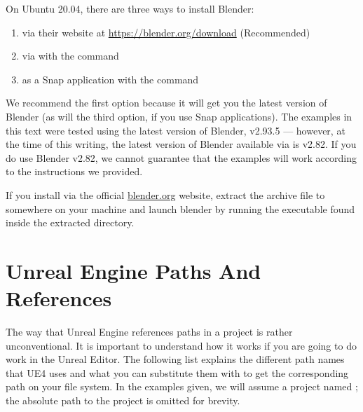 On Ubuntu 20.04, there are three ways to install Blender:

\begin{enumerate}
    \item via their website at \url{https://blender.org/download} (Recommended)
    \item via  with the command 
    \item as a Snap application with the command 
\end{enumerate}

We recommend the first option because it will get you the latest version of Blender (as will the third option, if you use Snap applications). The examples in this text were tested using the latest version of Blender, v2.93.5 --- however, at the time of this writing, the latest version of Blender available via  is v2.82. If you do use Blender v2.82, we cannot guarantee that the examples will work according to the instructions we provided.

If you install via the official \url{blender.org} website, extract the archive file to somewhere on your machine and launch blender by running the  executable found inside the extracted directory.

\section{Unreal Engine Paths And References}\label{apdx:unreal_paths}
The way that Unreal Engine references paths in a project is rather unconventional. It is important to understand how it works if you are going to do work in the Unreal Editor. The following list explains the different path names that UE4 uses and what you can substitute them with to get the corresponding path on your file system. In the examples given, we will assume a project named ; the absolute path to the project is omitted for brevity.

